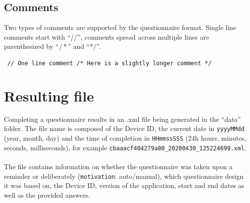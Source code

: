 \documentclass[11pt,a4paper,titlepage]{article}
\begin{document}
\subsection{Comments}

Two types of comments are supported by the questionnaire format. Single line comments start with ``//'', comments spread across multiple lines are parenthesized by ``\texttt{$/*$}'' and ``\texttt{$*/$}''.

\begin{center}
	\begin{tcolorbox}[colback=black!10!white,colframe=black!50!white, boxsep=1pt,left=4pt,right=4pt,top=4pt,bottom=2pt]
		\texttt{\noindent
			// One line comment\newline
			\newline
			/* Here is a\newline
			slightly longer\newline
			comment */
		}
	\end{tcolorbox}
\end{center}



\clearpage


\section{Resulting file}

Completing a questionnaire results in an .xml file being generated in the ``data'' folder. The file name is composed of the Device ID, the current date in \texttt{yyyyMMdd} (year, month, day) and the time of completion in \texttt{HHmmssSSS} (24h hours, minutes, seconds, milliseconds), for example \texttt{cbaaacf404279a80\_20200430\_125224699.xml}.\\
\\
The file contains information on whether the questionnaire was taken upon a reminder or deliberately (\texttt{motivation}: auto/manual), which questionnaire design it was based on, the Device ID, version of the application, start and end dates as well as the provided answers.
\end{document}

